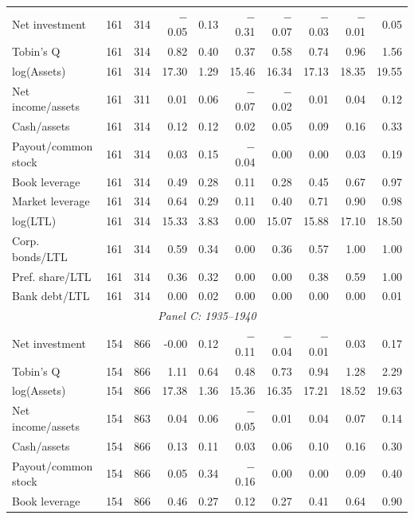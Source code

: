 \begin{table}[p]
\begin{threeparttable}
\begin{tabular}{lrrrrrrrrr}
            \midrule
            Net investment & 161 & 314 & $-$0.05 & 0.13 & $-$0.31 & $-$0.07 & $-$0.03 & $-$0.01 & 0.05 \\
            Tobin's Q & 161 & 314 & 0.82 & 0.40 & 0.37 & 0.58 & 0.74 & 0.96 & 1.56 \\
            log(Assets) & 161 & 314 & 17.30 & 1.29 & 15.46 & 16.34 & 17.13 & 18.35 & 19.55 \\
            Net income/assets & 161 & 311 & 0.01 & 0.06 & $-$0.07 & $-$0.02 & 0.01 & 0.04 & 0.12 \\
            Cash/assets & 161 & 314 & 0.12 & 0.12 & 0.02 & 0.05 & 0.09 & 0.16 & 0.33 \\
            Payout/common stock & 161 & 314 & 0.03 & 0.15 & $-$0.04 & 0.00 & 0.00 & 0.03 & 0.19 \\
            Book leverage & 161 & 314 & 0.49 & 0.28 & 0.11 & 0.28 & 0.45 & 0.67 & 0.97 \\
            Market leverage & 161 & 314 & 0.64 & 0.29 & 0.11 & 0.40 & 0.71 & 0.90 & 0.98 \\
            log(LTL) & 161 & 314 & 15.33 & 3.83 & 0.00 & 15.07 & 15.88 & 17.10 & 18.50 \\
            Corp. bonds/LTL & 161 & 314 & 0.59 & 0.34 & 0.00 & 0.36 & 0.57 & 1.00 & 1.00 \\
            Pref. share/LTL & 161 & 314 & 0.36 & 0.32 & 0.00 & 0.00 & 0.38 & 0.59 & 1.00 \\
            Bank debt/LTL & 161 & 314 & 0.00 & 0.02 & 0.00 & 0.00 & 0.00 & 0.00 & 0.01 \\
            \midrule
            \multicolumn{10}{c}{\textit{Panel C: 1935--1940}} \\
            \midrule
            Net investment & 154 & 866 & -0.00 & 0.12 & $-$0.11 & $-$0.04 & $-$0.01 & 0.03 & 0.17 \\
            Tobin's Q & 154 & 866 & 1.11 & 0.64 & 0.48 & 0.73 & 0.94 & 1.28 & 2.29 \\
            log(Assets) & 154 & 866 & 17.38 & 1.36 & 15.36 & 16.35 & 17.21 & 18.52 & 19.63 \\
            Net income/assets & 154 & 863 & 0.04 & 0.06 & $-$0.05 & 0.01 & 0.04 & 0.07 & 0.14 \\
            Cash/assets & 154 & 866 & 0.13 & 0.11 & 0.03 & 0.06 & 0.10 & 0.16 & 0.30 \\
            Payout/common stock & 154 & 866 & 0.05 & 0.34 & $-$0.16 & 0.00 & 0.00 & 0.09 & 0.40 \\
            Book leverage & 154 & 866 & 0.46 & 0.27 & 0.12 & 0.27 & 0.41 & 0.64 & 0.90 \\

\end{tabular}
\end{threeparttable}
\end{table}
